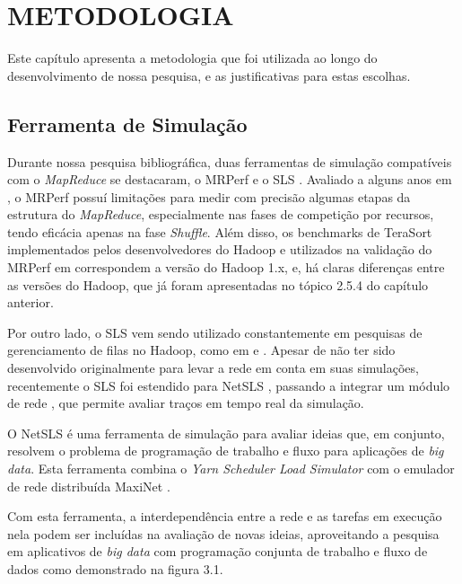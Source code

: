 \chapter{METODOLOGIA}

Este capítulo apresenta a metodologia que foi utilizada ao longo do desenvolvimento de nossa pesquisa, e as justificativas para estas escolhas.

\section{Ferramenta de Simulação}

Durante nossa pesquisa bibliográfica, duas ferramentas de simulação compatíveis com o \emph{MapReduce} se destacaram, o MRPerf \cite{wang2009using} e o SLS \cite{ApacheSLS}. Avaliado a alguns anos em \cite{liu2013hsim}, o MRPerf possuí limitações para medir com precisão algumas etapas da estrutura do \emph{MapReduce}, especialmente nas fases de competição por recursos, tendo eficácia apenas na fase \emph{Shuffle}. Além disso, os benchmarks de TeraSort implementados pelos desenvolvedores do Hadoop e utilizados na validação do MRPerf em \cite{wang2009using} correspondem a versão do Hadoop 1.x, e, há claras diferenças entre as versões do Hadoop, que já foram apresentadas no tópico 2.5.4 do capítulo anterior.

Por outro lado, o SLS vem sendo utilizado constantemente em pesquisas de gerenciamento de filas no Hadoop, como em \cite{sharma2015performance} e \cite{shao2016energy}. Apesar de não ter sido desenvolvido originalmente para levar a rede em conta em suas simulações, recentemente o SLS foi estendido para NetSLS \cite{wette2015extending}, passando a integrar um módulo de rede \cite{wette2014maxinet}, que permite avaliar traços em tempo real da simulação.

O NetSLS \cite{wette2015extending} é uma ferramenta de simulação para avaliar ideias que, em conjunto, resolvem o problema de programação de trabalho e fluxo para aplicações de \emph{big data}. Esta ferramenta combina o \emph{Yarn Scheduler Load Simulator} \cite{ApacheSLS} com o emulador de rede distribuída MaxiNet \cite{wette2014maxinet}.

Com esta ferramenta, a interdependência entre a rede e as tarefas em execução nela podem ser incluídas na avaliação de novas ideias, aproveitando a pesquisa em aplicativos de \emph{big data} com programação conjunta de trabalho e fluxo de dados como demonstrado na figura 3.1.

